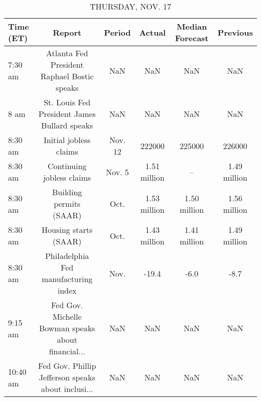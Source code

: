 \documentclass{article}%
\begin{document}
\begin{table}[htbp]%
\caption{THURSDAY, NOV. 17}%
\centering%
\begin{adjustbox}{width=1\textwidth}%
\begin{tabular}{lccccc}
\toprule
Time (ET) &                                             Report &  Period &       Actual & Median Forecast &     Previous \\
\midrule
  7:30 am &        Atlanta Fed President Raphael Bostic speaks &     NaN &          NaN &             NaN &          NaN \\
     8 am &       St. Louis Fed President James Bullard speaks &     NaN &          NaN &             NaN &          NaN \\
  8:30 am &                             Initial jobless claims & Nov. 12 &       222000 &          225000 &       226000 \\
  8:30 am &                          Continuing jobless claims &  Nov. 5 & 1.51 million &              -- & 1.49 million \\
  8:30 am &                            Building permits (SAAR) &    Oct. & 1.53 million &    1.50 million & 1.56 million \\
  8:30 am &                              Housing starts (SAAR) &    Oct. & 1.43 million &    1.41 million & 1.49 million \\
  8:30 am &               Philadelphia Fed manufacturing index &    Nov. &        -19.4 &            -6.0 &         -8.7 \\
  9:15 am & Fed Gov. Michelle Bowman speaks about financial... &     NaN &          NaN &             NaN &          NaN \\
 10:40 am & Fed Gov. Phillip Jefferson speaks about inclusi... &     NaN &          NaN &             NaN &          NaN \\
\bottomrule
\end{tabular}
%
\end{adjustbox}%
\end{table}

%
\end{document}
